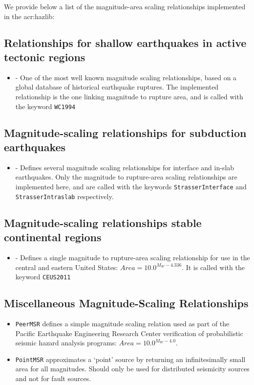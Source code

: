 We provide below a list of the magnitude-area scaling relationships
implemented in the \gls{acr:hazlib}:

\subsection{Relationships for shallow earthquakes in active tectonic regions}

\begin{itemize}

    \item \cite{wells1994} - One of the most well known magnitude scaling
	relationships, based on a global database of historical earthquake
	ruptures. The implemented relationship is the one linking magnitude to
	rupture area, and is called with the keyword \verb=WC1994=

\end{itemize}


\subsection{Magnitude-scaling relationships for subduction earthquakes}
\begin{itemize}
    \item \cite{Strasser2010} - Defines several magnitude scaling relationships for interface and in-slab earthquakes. Only the magnitude to rupture-area scaling relationships are implemented here, and are called with the keywords \verb=StrasserInterface= and \verb=StrasserIntraslab= respectively.
\end{itemize}

\subsection{Magnitude-scaling relationships stable continental regions}
\begin{itemize}
    \item \cite{ceus2011} - Defines a single magnitude to rupture-area scaling relationship for use in the central and eastern United States: $Area = 10.0^{M_W - 4.336}$. It is called with the keyword \verb=CEUS2011=
\end{itemize}

\subsection{Miscellaneous Magnitude-Scaling Relationships}
\begin{itemize}
    \item \verb=PeerMSR= defines a simple magnitude scaling relation used as part of the Pacific Earthquake Engineering Research Center verification of probabilistic seismic hazard analysis programs: $Area = 10.0 ^{M_W - 4.0}$.
    \item \verb=PointMSR= approximates a `point' source by returning an infinitesimally small area for all magnitudes. Should only be used for distributed seismicity sources and not for fault sources. 
\end{itemize}

%
